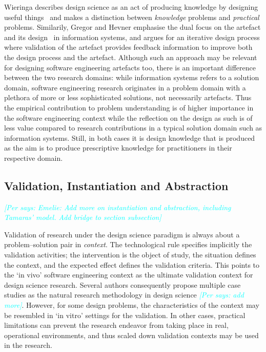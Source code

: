 \documentclass[graybox]{svmult}
\newcommand{\per}[1]{\textcolor{cyan}{{\it [Per says: #1]}}}
\newcommand{\per}[1]{}
\begin{document}


Wieringa describes design science as an act of producing knowledge by designing useful things~\cite{wieringa_design_2009} and makes a distinction between \emph{knowledge} problems and \emph{practical} problems. Similarily, Gregor and Hevner emphasise the dual focus on the artefact and its design~\cite{gregor_positioning_2013} in information systems, and argues for an iterative design process where validation of the artefact provides feedback information to improve both the design process and the artefact. Although such an approach may be relevant for designing software engineering artefacts too, there is an important difference between the two research domains: while information systems refers to a solution domain, software engineering research originates in a problem domain with a plethora of more or less sophisticated solutions, not necessarily artefacts. Thus the empirical contribution to problem understanding is of higher importance in the software engineering context while the reflection on the design as such is of less value compared to research contributions in a typical solution domain such as information systems. Still, in both cases it is design knowledge that is produced as the aim is to produce prescriptive knowledge for practitioners in their respective domain. 

 

\subsection{Validation, Instantiation and Abstraction}
\per{Emelie: Add more on instantiation and abstraction, including Tamaras' model. Add bridge to section subsection}

Validation of research under the design science paradigm is always about a problem--solution pair in \emph{context}. The technological rule specifies implicitly the validation activities; the intervention is the object of study, the situation defines the context, and the expected effect defines the validation criteria. This points to the `in vivo' software engineering context as the ultimate validation context for design science research. Several authors consequently propose multiple case studies as the natural research methodology in design science \cite{van_aken_management_2004}\per{add more}. However, for some design problems, the characteristics of the context may be resembled in `in vitro' settings for the validation. In other cases, practical limitations can prevent the research endeavor from taking place in real, operational environments, and thus scaled down validation contexts may be used in the research. 
\end{document}
